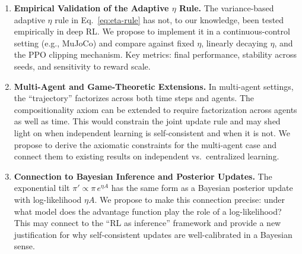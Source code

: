 \documentclass[11pt]{article}
\theoremstyle{definition}
\theoremstyle{remark}
\begin{document}
\begin{enumerate}[label=\textbf{(\arabic*)}]
\item \textbf{Empirical Validation of the Adaptive $\eta$ Rule.}
The variance-based adaptive $\eta$ rule in Eq.~\eqref{eq:eta-rule} has not, to our knowledge, been tested empirically in deep RL. We propose to implement it in a continuous-control setting (e.g., MuJoCo) and compare against fixed $\eta$, linearly decaying $\eta$, and the PPO clipping mechanism. Key metrics: final performance, stability across seeds, and sensitivity to reward scale.

\item \textbf{Multi-Agent and Game-Theoretic Extensions.}
In multi-agent settings, the ``trajectory'' factorizes across both time steps and agents. The compositionality axiom can be extended to require factorization across agents as well as time. This would constrain the joint update rule and may shed light on when independent learning is self-consistent and when it is not. We propose to derive the axiomatic constraints for the multi-agent case and connect them to existing results on independent vs.\ centralized learning.

\item \textbf{Connection to Bayesian Inference and Posterior Updates.}
The exponential tilt $\pi' \propto \pi\,e^{\eta A}$ has the same form as a Bayesian posterior update with log-likelihood $\eta A$. We propose to make this connection precise: under what model does the advantage function play the role of a log-likelihood? This may connect to the ``RL as inference'' framework and provide a new justification for why self-consistent updates are well-calibrated in a Bayesian sense.

\end{enumerate}

\end{document}
